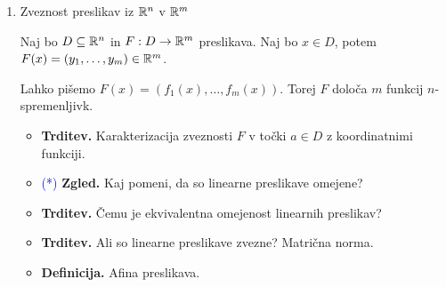 \begin{enumerate}
    \item Zveznost preslikav iz $\mathbb{R}^n$ v $\mathbb{R}^m$
    
    Naj bo $D \subseteq \mathbb{R}^n$ in $F: D \to \mathbb{R}^m$ preslikava. Naj bo $x \in D$, potem $F(x) = (y_1, \ldots, y_m) \in \mathbb{R}^m$.

    Lahko pišemo $F(x) = (f_1(x), \ldots, f_m(x))$. Torej $F$ določa $m$ funkcij $n$-spremenljivk.
    \begin{itemize}
        \item \textbf{Trditev.} Karakterizacija zveznosti $F$ v točki $a \in D$ z koordinatnimi funkciji.
        \item \textcolor{blue}{(*)} \textbf{Zgled.} Kaj pomeni, da so linearne preslikave omejene?
        \item \textbf{Trditev.} Čemu je ekvivalentna omejenost linearnih preslikav?
        \item \textbf{Trditev.} Ali so linearne preslikave zvezne? Matrična norma.
        \item \textbf{Definicija.} Afina preslikava.
    \end{itemize}
\end{enumerate}

